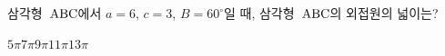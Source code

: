 삼각형~$\mathrm{ABC}$에서 $a=6$, $c=3$, $B=60^\circ$일 때, 삼각형~$\mathrm{ABC}$의 외접원의 넓이는?
\begin{choices32}{$5\pi$}{$7\pi$}{$9\pi$}{$11\pi$}{$13\pi$}\end{choices32}
